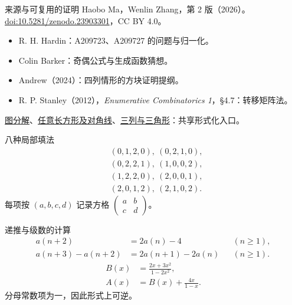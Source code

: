 \documentclass{beamer}
\begin{document}
\begin{frame}{来源与可复用的证明}
\small
Haobo Ma，Wenlin Zhang，第 2 版（2026）。\\
\href{https://doi.org/10.5281/zenodo.23903301}{doi:10.5281/zenodo.23903301}，CC BY 4.0。
\begin{itemize}
\item R. H. Hardin：A209723、A209727 的问题与归一化。
\item Colin Barker：奇偶公式与生成函数猜想。
\item Andrew（2024）：四列情形的方块证明提纲。
\item R. P. Stanley（2012），\emph{Enumerative Combinatorics 1}，§4.7：转移矩阵法。
\end{itemize}
\href{https://github.com/the-omega-institute/trureturing-requests/issues/222}{图分解}、\href{https://github.com/the-omega-institute/trureturing-requests/issues/223}{任意长方形及对角线}、\href{https://github.com/the-omega-institute/trureturing-requests/issues/224}{三列与三角形}：共享形式化入口。
\end{frame}
\appendix
\begin{frame}{八种局部填法}
\[
\begin{aligned}
&(0,1,2,0),\ (0,2,1,0),\\
&(0,2,2,1),\ (1,0,0,2),\\
&(1,2,2,0),\ (2,0,0,1),\\
&(2,0,1,2),\ (2,1,0,2).
\end{aligned}
\]
每项按 $(a,b,c,d)$ 记录方格 $\left(\begin{smallmatrix}a&b\\c&d\end{smallmatrix}\right)$。
\end{frame}
\begin{frame}{递推与级数的计算}
\[
\begin{aligned}
a(n+2)&=2a(n)-4 &&(n\geq1),\\
a(n+3)-a(n+2)&=2a(n+1)-2a(n) &&(n\geq1).
\end{aligned}
\]
\[
\begin{aligned}
B(x)&=\frac{2x+3x^2}{1-2x^2},\\
A(x)&=B(x)+\frac{4x}{1-x}.
\end{aligned}
\]
分母常数项为一，因此形式上可逆。
\end{frame}
\FormalVerification
\end{document}
